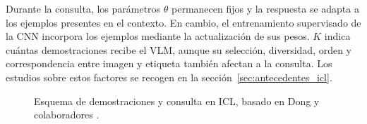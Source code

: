 Durante la consulta, los parámetros \(\theta\) permanecen fijos y la respuesta se adapta a los ejemplos presentes en el contexto. En cambio, el entrenamiento supervisado de la CNN incorpora los ejemplos mediante la actualización de sus pesos. \(K\) indica cuántas demostraciones recibe el VLM, aunque su selección, diversidad, orden y correspondencia entre imagen y etiqueta también afectan a la consulta. Los estudios sobre estos factores se recogen en la sección~\ref{sec:antecedentes_icl}.

\begin{figure}[H]
  \centering
  \caption{Esquema de demostraciones y consulta en ICL, basado en Dong y colaboradores \cite{dong2024survey}.}
  \label{fig:icl_context_related_work}
\end{figure}
